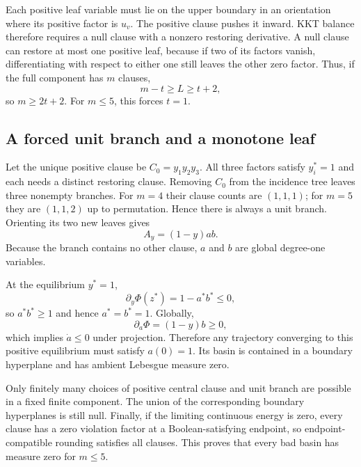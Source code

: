 \documentclass[11pt,a4paper]{article}
\begin{document}
Each positive leaf variable must lie on the upper boundary in an orientation where its positive factor is $u_v$. The positive clause pushes it inward. KKT balance therefore requires a null clause with a nonzero restoring derivative. A null clause can restore at most one positive leaf, because if two of its factors vanish, differentiating with respect to either one still leaves the other zero factor. Thus, if the full component has $m$ clauses,
\[
m-t\ge L\ge t+2,
\]
so $m\ge2t+2$. For $m\le5$, this forces $t=1$.
\subsection{A forced unit branch and a monotone leaf}
Let the unique positive clause be $C_0=y_1y_2y_3$. All three factors satisfy $y_i^*=1$ and each needs a distinct restoring clause. Removing $C_0$ from the incidence tree leaves three nonempty branches. For $m=4$ their clause counts are $(1,1,1)$; for $m=5$ they are $(1,1,2)$ up to permutation. Hence there is always a unit branch. Orienting its two new leaves gives
\begin{equation}A_y=(1-y)ab.\end{equation}
Because the branch contains no other clause, $a$ and $b$ are global degree-one variables.

At the equilibrium $y^*=1$,
\[
\partial_y\Phi(z^*)=1-a^*b^*\le0,
\]
so $a^*b^*\ge1$ and hence $a^*=b^*=1$. Globally,
\begin{equation}\partial_a\Phi=(1-y)b\ge0,\end{equation}
which implies $\dot a\le0$ under projection. Therefore any trajectory converging to this positive equilibrium must satisfy $a(0)=1$. Its basin is contained in a boundary hyperplane and has ambient Lebesgue measure zero.

Only finitely many choices of positive central clause and unit branch are possible in a fixed finite component. The union of the corresponding boundary hyperplanes is still null. Finally, if the limiting continuous energy is zero, every clause has a zero violation factor at a Boolean-satisfying endpoint, so endpoint-compatible rounding satisfies all clauses. This proves that every bad basin has measure zero for $m\le5$.
\end{document}
